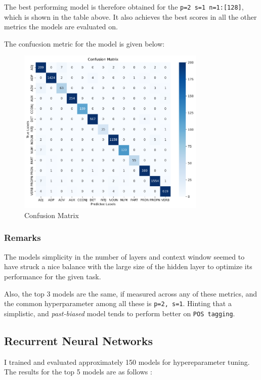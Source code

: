 The best performing model is therefore obtained for the \verb|p=2 s=1 n=1:[128]|, which is shown in the table above. It also achieves the best scores in all the other metrics the models are evaluated on.

The confucsion metric for the model is given below:

\begin{figure}[h]
    \centering
    \includegraphics[width=0.8\textwidth]{../pictures/ConfusionMatrixBestFFNN.png}
    \caption{Confusion Matrix}
\end{figure}

\subsubsection{Remarks}
The models simplicity in the number of layers and context window seemed to have struck a nice balance with the large size of the hidden layer to optimize its performance for the given task.

Also, the top 3 models are the same, if measured across any of these metrics, and the common hyperparameter among all these is \verb|p=2, s=1|. Hinting that a simplistic, and \textit{past-biased} model tends to perform better on \verb|POS tagging|.


\subsection*{Recurrent Neural Networks}

I trained and evaluated approximately 150 models for hypereparameter tuning. The results for the top 5 models are as follows :

